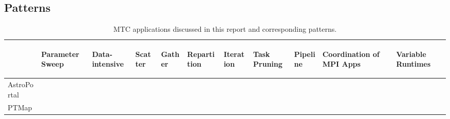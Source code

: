 \documentclass[10pt,letterpaper]{article}
\begin{document}
\subsection{Patterns\label{section:patterns}}


\begin{table}[t]
    \caption {MTC applications discussed in this report and corresponding patterns.  }
    \label{MTCAppsStats}
    \center
    { \footnotesize \renewcommand{\tabcolsep}{3pt}
    \begin{tabular}{|m{3.5cm}||>{\centering\arraybackslash}m{0.5cm}|>{\centering\arraybackslash}m{0.5cm}|>{\centering\arraybackslash}m{0.5cm}|>{\centering\arraybackslash}m{0.5cm}|>{\centering\arraybackslash}m{0.5cm}|>{\centering\arraybackslash}m{0.5cm}|>{\centering\arraybackslash}m{0.5cm}|>{\centering\arraybackslash}m{0.5cm}|>{\centering\arraybackslash}m{0.5cm}|>{\centering\arraybackslash}m{0.5cm}|}
            \hline
                        &\begin{sideways} Parameter Sweep  \end{sideways} & \begin{sideways}Data-intensive \end{sideways}& \begin{sideways}Scatter \end{sideways}  & \begin{sideways}Gather  \end{sideways} & \begin{sideways}Repartition \end{sideways}  & \begin{sideways}Iteration \end{sideways}	& \begin{sideways}Task Pruning \end{sideways} & \begin{sideways}Pipeline \end{sideways} & \begin{sideways} {\space Coordination of MPI Apps \space} \end{sideways}	& \begin{sideways}Variable Runtimes \end{sideways}\\
            \hline \hline
    AstroPortal	        &	            &{}	    &	        &	    &	            &	        &	        &	    &	                        &\\
            \hline
    PTMap	        &	            &{}	    &{} &{} &               &	        &	        &{} &	                        &\\

\end{tabular}}
\end{table}
\end{document}
